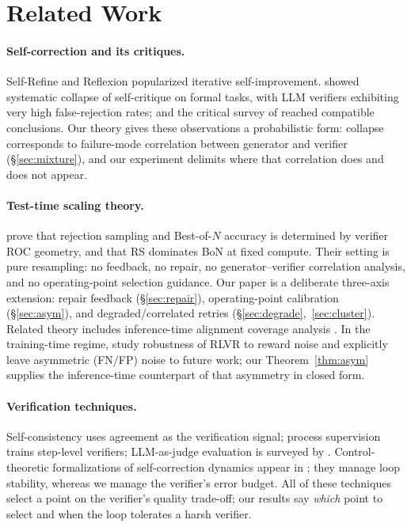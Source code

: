\documentclass[11pt]{article}
\begin{document}
\section{Related Work}\label{sec:related}

\paragraph{Self-correction and its critiques.}
Self-Refine \citep{madaan2023selfrefine} and Reflexion
\citep{shinn2023reflexion} popularized iterative self-improvement.
\citet{stechly2024selfverify} showed systematic collapse of
self-critique on formal tasks, with LLM verifiers exhibiting very
high false-rejection rates; \citet{huang2024cannot} and the critical
survey of \citet{kamoi2024when} reached compatible conclusions.  Our
theory gives these observations a probabilistic form: collapse
corresponds to failure-mode correlation between generator and
verifier (§\ref{sec:mixture}), and our experiment delimits where
that correlation does and does not appear.

\paragraph{Test-time scaling theory.}
\citet{dorner2026rocnreroll} prove that rejection sampling and
Best-of-$N$ accuracy is determined by verifier ROC geometry, and
that RS dominates BoN at fixed compute.  Their setting is pure
resampling: no feedback, no repair, no generator--verifier
correlation analysis, and no operating-point selection guidance.
Our paper is a deliberate three-axis extension: repair feedback
(§\ref{sec:repair}), operating-point calibration
(§\ref{sec:asym}), and degraded/correlated retries
(§\ref{sec:degrade},~\ref{sec:cluster}).  Related theory includes
inference-time alignment coverage analysis
\citep{huang2025bestofn}.  In the training-time regime,
\citet{plesner2026imperfect} study robustness of RLVR to reward
noise and explicitly leave asymmetric (FN/FP) noise to future work;
our Theorem~\ref{thm:asym} supplies the inference-time counterpart
of that asymmetry in closed form.

\paragraph{Verification techniques.}
Self-consistency \citep{wang2023selfconsistency} uses agreement as
the verification signal; process supervision
\citep{lightman2024verify} trains step-level verifiers;
LLM-as-judge evaluation is surveyed by \citet{zheng2023judging}.
Control-theoretic formalizations of self-correction dynamics appear
in \citet{wu2026cybercorrect}; they manage loop stability, whereas
we manage the verifier's error budget.  All of these techniques
select a point on the verifier's quality trade-off; our results say
\emph{which} point to select and when the loop tolerates a harsh
verifier.
\end{document}
